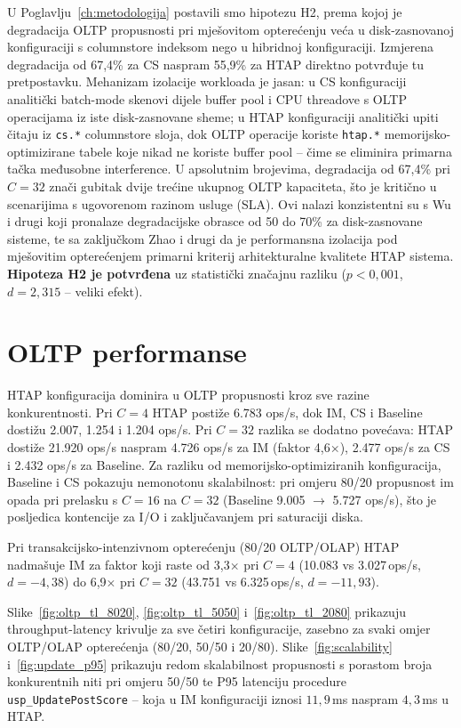 U Poglavlju~\ref{ch:metodologija} postavili smo hipotezu H2, prema kojoj je degradacija OLTP propusnosti pri mješovitom opterećenju veća u disk-zasnovanoj konfiguraciji s columnstore indeksom nego u hibridnoj konfiguraciji. Izmjerena degradacija od 67,4\% za CS naspram 55,9\% za HTAP direktno potvrđuje tu pretpostavku. Mehanizam izolacije workloada je jasan: u CS konfiguraciji analitički batch-mode skenovi dijele buffer pool i CPU threadove s OLTP operacijama iz iste disk-zasnovane sheme; u HTAP konfiguraciji analitički upiti čitaju iz \texttt{cs.*} columnstore sloja, dok OLTP operacije koriste \texttt{htap.*} memorijsko-optimizirane tabele koje nikad ne koriste buffer pool -- čime se eliminira primarna tačka međusobne interference. U apsolutnim brojevima, degradacija od 67,4\% pri $C=32$ znači gubitak dvije trećine ukupnog OLTP kapaciteta, što je kritično u scenarijima s ugovorenom razinom usluge (SLA). Ovi nalazi konzistentni su s Wu i drugi \cite{wu2025htap} koji pronalaze degradacijske obrasce od 50 do 70\% za disk-zasnovane sisteme, te sa zaključkom Zhao i drugi \cite{zhao2023benchmarking} da je performansna izolacija pod mješovitim opterećenjem primarni kriterij arhitekturalne kvalitete HTAP sistema. \textbf{Hipoteza H2 je potvrđena} uz statistički značajnu razliku ($p<0{,}001$, $d=2{,}315$ -- veliki efekt).

\section{OLTP performanse}
\label{sec:oltp_rezultati}

HTAP konfiguracija dominira u OLTP propusnosti kroz sve razine konkurentnosti. Pri $C=4$ HTAP postiže 6.783 ops/s, dok IM, CS i Baseline dostižu 2.007, 1.254 i 1.204 ops/s. Pri $C=32$ razlika se dodatno povećava: HTAP dostiže 21.920 ops/s naspram 4.726 ops/s za IM (faktor 4,6$\times$), 2.477 ops/s za CS i 2.432 ops/s za Baseline. Za razliku od memorijsko-optimiziranih konfiguracija, Baseline i CS pokazuju nemonotonu skalabilnost: pri omjeru 80/20 propusnost im opada pri prelasku s $C=16$ na $C=32$ (Baseline 9.005 $\to$ 5.727 ops/s), što je posljedica kontencije za I/O i zaključavanjem pri saturaciji diska.

Pri transakcijsko-intenzivnom opterećenju (80/20 OLTP/OLAP) HTAP nadmašuje IM za faktor koji raste od 3,3$\times$ pri $C=4$ (10.083 vs 3.027\,ops/s, $d=-4,38$) do 6,9$\times$ pri $C=32$ (43.751 vs 6.325\,ops/s, $d=-11,93$).

Slike~\ref{fig:oltp_tl_8020}, \ref{fig:oltp_tl_5050} i~\ref{fig:oltp_tl_2080} prikazuju throughput-latency krivulje za sve četiri konfiguracije, zasebno za svaki omjer OLTP/OLAP opterećenja (80/20, 50/50 i 20/80). Slike~\ref{fig:scalability} i~\ref{fig:update_p95} prikazuju redom skalabilnost propusnosti s porastom broja konkurentnih niti pri omjeru 50/50 te P95 latenciju procedure \texttt{usp\_UpdatePostScore} -- koja u IM konfiguraciji iznosi $11{,}9$\,ms naspram $4{,}3$\,ms u HTAP.


